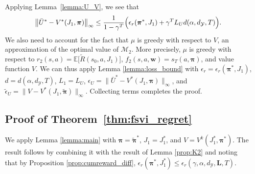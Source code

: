 \documentclass[11pt, notitlepage]{article}
\newcommand{\E}{\mathbb{E}}
\newcommand{\1}{\mathbbm{1}}
\begin{document}
    Applying Lemma~\ref{lemma:U_V}, we see that
\begin{align*}
    \bigl\|\bar{U}^* - V^*(J_1, \boldsymbol{\pi})\bigr\|_\infty \leq \frac{1}{1-\gamma^T} \Bigl( \epsilon_r(\boldsymbol{\pi}^*, J_1) +   \gamma^T L_{U} d(\alpha,d_\mathcal{Y},T)  \Bigr).
\end{align*}
We also need to account for the fact that $\mu$ is greedy with respect to $V$, an approximation of the optimal value of $\mathcal M_2$. More precisely, $\mu$ is greedy with respect to $r_2(s,a) = \E\bigl[\tilde{R}(s_0, a, J_1)\bigr]$, $f_2(s,a,\boldsymbol{w}) = s_T(a, \boldsymbol{\pi})$, and value function $V$. We can thus apply Lemma \ref{lemma:loss_bound} with $\epsilon_r = \epsilon_r(\boldsymbol{\pi}^*, J_1)$, $d=d(\alpha, d_\mathcal{Y}, T)$, $L_1 = L_U$, $\epsilon_U = \bigl\|\bar{U}^* - V^*(J_1, \boldsymbol{\pi})\bigr\|_\infty$, and $\tilde{\epsilon}_U = \bigl\|V - V^*(J_1,\tilde{\boldsymbol{\pi}})\bigr\|_\infty$. Collecting terms completes the proof.



\subsection{Proof of Theorem~\ref{thm:fsvi_regret}}
\label{sec:proof_thm:fsvi_regret}

We apply Lemma \ref{lemma:main} with $\boldsymbol{\pi} = \tilde{\boldsymbol{\pi}}^*$, $J_1 = J_1^*$, and $V = V^{k}(J_1^*,\boldsymbol{\pi}^*)$. The result follows by combining it with the result of Lemma \ref{prop:K2} and noting that by Proposition \ref{prop:cumreward_diff}, $\epsilon_r(\boldsymbol{\pi}^*, J^*_{1}) \le \epsilon_r(\gamma,\alpha,d_\mathcal{Y},\mathbf{L},T)$.



























    
    
    
    
    
    
    
    
    
\end{document}
